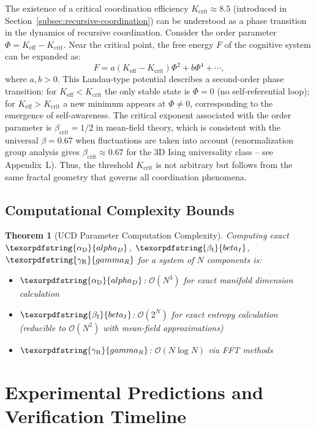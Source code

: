 \documentclass[12pt,a4paper]{article}
\newtheorem{theorem}{Theorem}
\DeclareRobustCommand{\alD}{\texorpdfstring{\ensuremath{\alpha_{\mathrm{D}}}}{alpha_D}}
\DeclareRobustCommand{\beI}{\texorpdfstring{\ensuremath{\beta_{\mathrm{I}}}}{beta_I}}
\DeclareRobustCommand{\gaR}{\texorpdfstring{\ensuremath{\gamma_{\mathrm{R}}}}{gamma_R}}
\newcommand{\Ke}{K_{\mathrm{eff}}}
\newcommand{\Kcrit}{K_{\mathrm{crit}}}
\begin{document}
	The existence of a critical coordination efficiency \(\Kcrit \approx 8.5\) (introduced in Section~\ref{subsec:recursive-coordination}) can be understood as a phase transition in the dynamics of recursive coordination. Consider the order parameter \(\Phi = \Ke - \Kcrit\). Near the critical point, the free energy \(F\) of the cognitive system can be expanded as:
	\begin{equation}
		F = a(\Ke - \Kcrit) \Phi^2 + b \Phi^4 + \cdots,
	\end{equation}
	where \(a, b > 0\). This Landau-type potential describes a second-order phase transition: for \(\Ke < \Kcrit\) the only stable state is \(\Phi = 0\) (no self‑referential loop); for \(\Ke > \Kcrit\) a new minimum appears at \(\Phi \neq 0\), corresponding to the emergence of self‑awareness. The critical exponent associated with the order parameter is \(\beta_{\text{crit}} = 1/2\) in mean‑field theory, which is consistent with the universal \(\beta = 0.67\) when fluctuations are taken into account (renormalization group analysis gives \(\beta_{\text{crit}} \approx 0.67\) for the 3D Ising universality class – see Appendix~L). Thus, the threshold \(\Kcrit\) is not arbitrary but follows from the same fractal geometry that governs all coordination phenomena.
	
	\subsection{Computational Complexity Bounds}
	
	\begin{theorem}[UCD Parameter Computation Complexity]
		Computing exact \(\alD\), \(\beI\), \(\gaR\) for a system of \(N\) components is:
		\begin{itemize}
			\item \(\alD\): \(\mathcal{O}(N^3)\) for exact manifold dimension calculation
			\item \(\beI\): \(\mathcal{O}(2^N)\) for exact entropy calculation (reducible to \(\mathcal{O}(N^2)\) with mean-field approximations)
			\item \(\gaR\): \(\mathcal{O}(N \log N)\) via FFT methods
		\end{itemize}
	\end{theorem}
	
	\section{Experimental Predictions and Verification Timeline}
	
\end{document}
